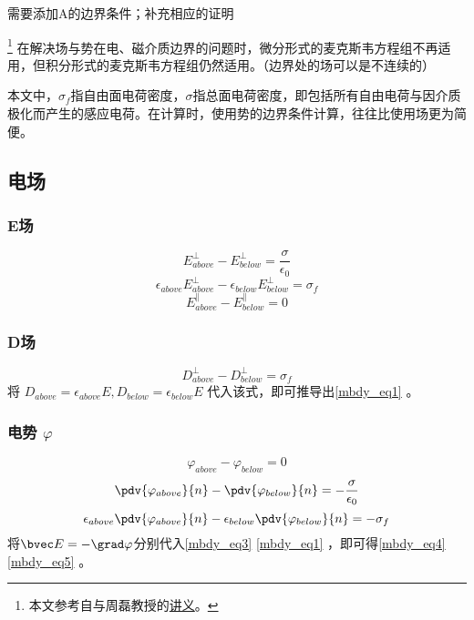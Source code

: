 
\begin{issues}
\issueTODO 需要添加A的边界条件；补充相应的证明
\end{issues}

\footnote{本文参考自\cite{GriffE}与周磊教授的\href{http://fdjpkc.fudan.edu.cn/d200927/2009/0314/c8569a14801/page.htm}{讲义}。}
在解决场与势在电、磁介质边界的问题时，微分形式的麦克斯韦方程组不再适用，但积分形式的麦克斯韦方程组仍然适用。（边界处的场可以是不连续的）

本文中，$\sigma_f$指自由面电荷密度，$\sigma$指总面电荷密度，即包括所有自由电荷与因介质极化而产生的感应电荷。在计算时，使用势的边界条件计算，往往比使用场更为简便。

\subsection{电场}

\subsubsection{E场}
\begin{equation}\label{mbdy_eq3}
E^\perp_{above} - E^\perp_{below} = \frac{\sigma}{\epsilon_0}
\end{equation}
\begin{equation}\label{mbdy_eq1}
\epsilon_{above}E^\perp_{above} - \epsilon_{below}E^\perp_{below} = \sigma_f
\end{equation}
\begin{equation}
E^\parallel_{above} - E^\parallel_{below} = 0
\end{equation}

\subsubsection{D场}
\begin{equation}\label{mbdy_eq6}
D^\perp_{above} - D^\perp_{below} = \sigma_f
\end{equation}
将 $D_{above}=\epsilon_{above} E, D_{below}=\epsilon_{below} E$ 代入该式，即可推导出\autoref{mbdy_eq1} 。

\subsubsection{电势 $\varphi$}
\begin{equation}
\varphi_{above}-\varphi_{below}=0
\end{equation}
\begin{equation}\label{mbdy_eq4}
\pdv{\varphi_{above}}{n} - \pdv{\varphi_{below}}{n}  = -\frac{\sigma}{\epsilon_0}
\end{equation}
\begin{equation}\label{mbdy_eq5}
\epsilon_{above}\pdv{\varphi_{above}}{n} - \epsilon_{below}\pdv{\varphi_{below}}{n}  = -\sigma_f
\end{equation}
将$\bvec E= -\grad \varphi$分别代入\autoref{mbdy_eq3} \autoref{mbdy_eq1} ，即可得\autoref{mbdy_eq4} \autoref{mbdy_eq5} 。


